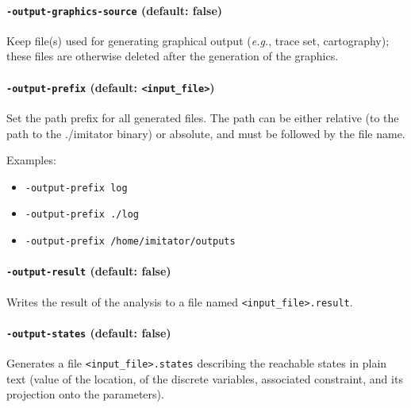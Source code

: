 \documentclass[a4paper,11pt]{report}
\makeatletter
\newcommand{\binimitator}{./imitator}
\newcommand{\styleOption}[1]{\textcolor{optioncolor}{\texttt{#1}}}
\newcommand{\stylePath}[1]{\textcolor{pathcolor}{\texttt{#1}}}
\newcommand{\eg}{\textcolor{colorok}{\textit{e.g.},\@}}
\makeatother
\begin{document}
\paragraph{\styleOption{-output-graphics-source} (default: false)}
Keep file(s) used for generating graphical output (\eg{} trace set, cartography); these files are otherwise deleted after the generation of the graphics.


\paragraph{\styleOption{-output-prefix} (default: \stylePath{<input\_file>})}
Set the path prefix for all generated files.
The path can be either relative (to the path to the \binimitator{} binary) or absolute, and must be followed by the file name.

Examples:
\begin{itemize}
	\item \styleOption{-output-prefix log}
	\item \styleOption{-output-prefix ./log}
	\item \styleOption{-output-prefix /home/imitator/outputs}
\end{itemize}


\paragraph{\styleOption{-output-result} (default: false)}
Writes the result of the analysis to a file named \stylePath{<input\_file>.result}.




\paragraph{\styleOption{-output-states} (default: false)}
Generates a file \stylePath{<input\_file>.states} describing the reachable states in plain text (value of the location, of the discrete variables, associated constraint, and its projection onto the parameters).
\end{document}
